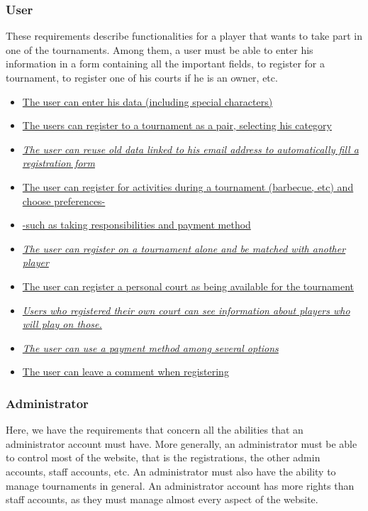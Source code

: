 \documentclass[a4paper, 12pt]{article}
\begin{document}
\subsubsection*{User}
	
	These requirements describe functionalities for a player that wants to take part in one of the tournaments. Among them, a user must be able to enter his information in a form containing all the important fields, to register for a tournament, to register one of his courts if he is an owner, etc.\\
	
	\begin{itemize}
		\item \underline{The user can enter his data (including special characters) }
		\item \underline{The users can register to a tournament as a pair, selecting his category}
		\item \underline{\textit{The user can reuse old data linked to his email address to automatically fill a registration form}}
		\item \underline{The user can register for activities during a tournament (barbecue, etc) and choose preferences-} 
		
		\item \underline{-such as taking responsibilities and payment method}
		\item \underline{\textit{The user can register on a tournament alone and be matched with another player}}
		\item \underline{The user can register a personal court as being available for the tournament}
		\item \underline{\textit{Users who registered their own court can see information about players who will play on those.}}
		\item \underline{\textit{The user can use a payment method among several options}}
		\item \underline{The user can leave a comment when registering}
		
	\end{itemize}

\subsubsection*{Administrator}
    Here, we have the requirements that concern all the abilities that an administrator account must have. More generally, an administrator must be able to control most of the website, that is the registrations, the other admin accounts, staff accounts, etc. An administrator must also have the ability to manage tournaments in general. An administrator account has more rights than staff accounts, as they must manage almost every aspect of the website.\\ 
    
\end{document}

